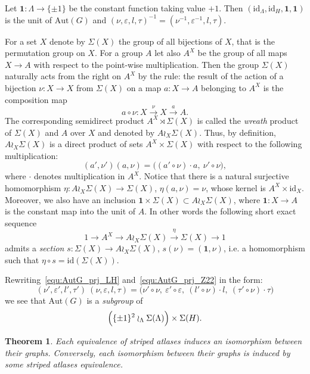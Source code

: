 \documentclass[12pt, reqno]{amsart}
\newcommand{\theoremname}{Theorem}%
\newtheorem{theorem}[subsection]{\protect\theoremname}
\newcommand{\StInd}{\Lambda}
\newcommand{\id}{\mathrm{id}}
\newcommand\Gr{G}
\newcommand\AutG{\mathrm{Aut}(\Gr)}
\newcommand\lori{l}
\newcommand\tori{\tau}
\newcommand\eiso{\varepsilon}
\newcommand\viso{\nu}
\newcommand\mZZ{\{\pm1\}}
\begin{document}
Let $\mathbf{1}:\StInd\to\mZZ$ be the constant function taking value $+1$.
Then $(\id_{\StInd}, \id_{H}, \mathbf{1}, \mathbf{1})$ is the unit of $\AutG$ and $(\viso, \eiso, \lori, \tori)^{-1} = (\viso^{-1}, \eiso^{-1}, \lori, \tori)$.

For a set $X$ denote by $\Sigma(X)$ the group of all bijections of $X$, that is the permutation group on $X$.
For a group $A$ let also $A^X$ be the group of all maps $X \to A$ with respect to the point-wise multiplication.
Then the group $\Sigma(X)$ naturally acts from the right on $A^X$ by the rule: the result of the action of a bijection $\viso:X \to X$ from $\Sigma(X)$ on a map $a:X \to A$ belonging to $A^X$ is the composition map
\[
a\circ \viso: X \xrightarrow{~~\viso~~} X \xrightarrow{~~a~~} A.
\]
The corresponding semidirect product $A^X \rtimes \Sigma(X)$ is called the \textit{wreath} product of $\Sigma(X)$ and $A$ over $X$ and denoted by $A \wr_{X} \Sigma(X)$.
Thus, by definition, $A \wr_{X} \Sigma(X)$ is a direct product of sets $A^X \times \Sigma(X)$ with respect to the following multiplication:
\[
(a',\viso') (a, \viso) = \bigl((a'\circ\viso) \cdot a, \ \viso'\circ\viso),
\]
where $\cdot$ denotes multiplication in $A^X$.
Notice that there is a natural surjective homomorphism $\eta:A \wr_{X} \Sigma(X) \to \Sigma(X)$, $\eta(a,\viso) = \viso$, whose kernel is $A^X \times \id_{X}$.
Moreover, we also have an inclusion $\mathbf{1} \times \Sigma(X) \subset A \wr_{X} \Sigma(X)$, where $\mathbf{1}:X \to A$ is the constant map into the unit of $A$.
In other words the following short exact sequence
\[
1 \to A^X \to A \wr_{X} \Sigma(X) \xrightarrow{~~\eta~~}  \Sigma(X) \to 1
\]
admits a \textit{section} $s:\Sigma(X) \to A \wr_{X} \Sigma(X)$, $s(\viso) = (\mathbf{1},\viso)$, i.e. a homomorphism such that $\eta\circ s = \id(\Sigma(X))$.

Rewriting~\eqref{equ:AutG_prj_LH} and~\eqref{equ:AutG_prj_Z22} in the form:
\[
(\viso', \eiso', \lori', \tori')\ (\viso, \eiso, \lori, \tori) = 
\bigr(\viso' \circ\viso, \
\eiso' \circ \eiso, \ 
(\lori'\circ\viso) \cdot \lori, \
(\tori'\circ\viso) \cdot \tori
\bigl)
\]
we see that $\AutG$ is a \textit{subgroup} of
\[
\Bigl( \mZZ^2 \wr_{\StInd} \Sigma(\StInd) \Bigr) \times \Sigma(H).
\]


\begin{theorem}\label{th:iso_atlas_iso_graph}
Each equivalence of striped atlases induces an isomorphism between their graphs.
Conversely, each isomorphism between their graphs is induced by some striped atlases equivalence.
\end{theorem}
\end{document}
